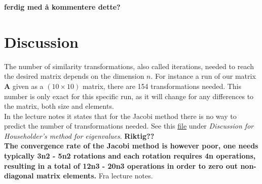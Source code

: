 \documentclass{article}
\begin{document}
  \textbf{ferdig med å kommentere dette?}

\vspace{1cm}

\section{Discussion} \label{sec:Discussion}


  The number of similarity transformations, also called iterations, needed to reach the desired matrix depends on the dimension $n$. For instance a run of our matrix \textbf{A} given as a $(10 \times 10)$ matrix, there are 154 transformations needed. This number is only exact for this specific run, as it will change for any differences to the matrix, both size and elements. \\

  In the lecture notes it states that for the Jacobi method there is no way to predict the number of transformations needed. See this \href{http://compphysics.github.io/ComputationalPhysics/doc/pub/eigvalues/html/eigvalues.html}{file} under \textit{Discussion for Householder's method for eigenvalues}. \textbf{Riktig??} \\

  \textbf{The convergence rate of the Jacobi method is however poor, one needs typically 3n2 - 5n2 rotations and each rotation requires 4n operations, resulting in a total of 12n3 - 20n3 operations in order to zero out non-diagonal matrix elements.} Fra lecture notes. \\
\end{document}
